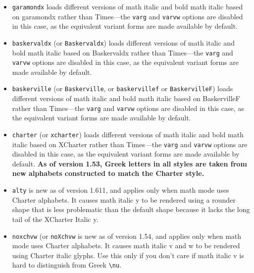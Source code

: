\documentclass[\fsc]{article}
\theoremstyle{oldplain}
\theoremstyle{plain}
\begin{document}
\begin{itemize}
\item {\tt garamondx} loads different versions of math italic and bold math italic based on \textsf{garamondx} rather than \textsf{Times}---the {\tt varg} and {\tt varvw} options are disabled in this case, as the equivalent variant forms are made available by default.
\item {\tt baskervaldx} (or {\tt Baskervaldx}) loads different versions of math italic and bold math italic based on \textsf{Baskervaldx} rather than \textsf{Times}---the {\tt varg} and {\tt varvw} options are disabled in this case, as the equivalent variant forms are made available by default.
\item {\tt baskerville} (or {\tt Baskerville}, or {\tt baskervillef} or {\tt BaskervilleF}) loads different versions of math italic and bold math italic based on \textsf{BaskervilleF} rather than \textsf{Times}---the {\tt varg} and {\tt varvw} options are disabled in this case, as the equivalent variant forms are made available by default.
\item {\tt charter} (or {\tt xcharter}) loads different versions of math italic and bold math italic based on \textsf{XCharter} rather than \textsf{Times}---the {\tt varg} and {\tt varvw} options are disabled in this case, as the equivalent variant forms are made available by default. \textbf{As of version 1.53, Greek letters in all styles are taken from  new alphabets constructed to match the Charter style.}
\item {\tt alty}  is new as of version 1.611, and applies only when math mode uses Charter alphabets. It causes math italic y to be rendered using a rounder shape that is less problematic than the default shape because it lacks the long tail of the XCharter Italic {y}.
\item {\tt noxchvw} (or {\tt noXchvw} is new as of version 1.54, and applies only when math mode uses Charter alphabets. It causes math italic v and w to be rendered using Charter italic glyphs. Use this only if you don't care if math italic v is hard to distinguish from Greek \verb|\nu|.


\end{itemize}
\end{document}
